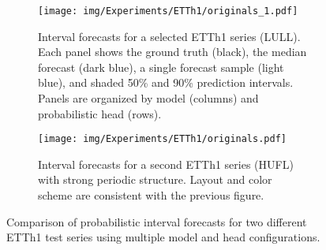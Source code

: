 \documentclass[a4paper,oneside,bibliography=totoc]{scrbook}
\begin{document}
\begin{figure}[htbp]
\centering
\begin{subfigure}[t]{0.45\textwidth}
    \centering
    \texttt{[image: img/Experiments/ETTh1/originals\_1.pdf]}
    \caption{Interval forecasts for a selected ETTh1 series (LULL). Each panel shows the ground truth (black), the median forecast (dark blue), a single forecast sample (light blue), and shaded 50\% and 90\% prediction intervals. Panels are organized by model (columns) and probabilistic head (rows).}
    \label{fig:ETTh1_intervals}
\end{subfigure}
\hfill
\begin{subfigure}[t]{0.45\textwidth}
    \centering
    \texttt{[image: img/Experiments/ETTh1/originals.pdf]}
    \caption{Interval forecasts for a second ETTh1 series (HUFL) with strong periodic structure. Layout and color scheme are consistent with the previous figure.}
    \label{fig:ETTh1_intervals_2}
\end{subfigure}
\caption{Comparison of probabilistic interval forecasts for two different ETTh1 test series using multiple model and head configurations.}
\label{fig:ETTh1_intervals_3}
\end{figure}
\end{document}
